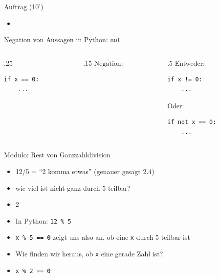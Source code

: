 \begin{frame}{Auftrag (10')}
\begin{itemize}
    \item {}
\end{itemize}

\end{frame}


\begin{frame}[fragile]{Negation von Aussagen in Python: \lstinline|not|}
\begin{columns}
\begin{column}{.25\textwidth}
\begin{lstlisting}
if x == 0:
	...
\end{lstlisting}
\end{column}
\begin{column}{.15\textwidth}
$\underrightarrow{\text{Negation:}}$
\end{column}
\begin{column}{.5\textwidth}
Entweder:
\begin{lstlisting}
if x != 0:
	...
\end{lstlisting}

Oder:
\begin{lstlisting}
if not x == 0:
	...
\end{lstlisting}
\end{column}
\end{columns}
\end{frame}

\begin{frame}[fragile]{Modulo: Rest von Ganzzahldivision}
\begin{itemize}[<+->]
\item 12/5 = ``2 komma etwas'' (genauer gesagt 2.4)
\item wie viel ist nicht ganz durch 5 teilbar?
\item 2 
\item In Python: \lstinline|12 % 5|

\item \lstinline|x % 5 == 0| zeigt uns also an, ob eine \lstinline|x| durch 5 teilbar ist
\item Wie finden wir heraus, ob \lstinline|x| eine gerade Zahl ist?
\item \lstinline|x % 2 == 0|
\end{itemize}
\end{frame}

